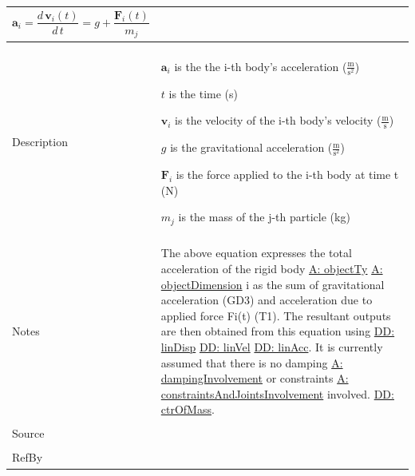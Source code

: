\documentclass[12pt]{article}
\begin{document}
\begin{minipage}{\textwidth}
\begin{tabular}{p{} p{}}
\begin{dmath}
           {\mathbf{a}_{i}}=\frac{d\,{\mathbf{v}_{i}}\left(t\right)}{d\,t}=g+\frac{{\mathbf{F}_{i}}\left(t\right)}{{m_{j}}}
           \end{dmath}
\\ \midrule \\
Description & \begin{symbDescription}
              \item{${\mathbf{a}_{i}}$ is the the i-th body's acceleration ($\frac{\text{m}}{\text{s}^{2}}$)}
              \item{$t$ is the time (s)}
              \item{${\mathbf{v}_{i}}$ is the velocity of the i-th body's velocity ($\frac{\text{m}}{\text{s}}$)}
              \item{$g$ is the gravitational acceleration ($\frac{\text{m}}{\text{s}^{2}}$)}
              \item{${\mathbf{F}_{i}}$ is the force applied to the i-th body at time t (N)}
              \item{${m_{j}}$ is the mass of the j-th particle (kg)}
              \end{symbDescription}
\\ \midrule \\
Notes & The above equation expresses the total acceleration of the rigid body \hyperref[A:objectTy]{A: objectTy} \hyperref[A:objectDimension]{A: objectDimension} i as the sum of gravitational acceleration (GD3) and acceleration due to applied force Fi(t) (T1). The resultant outputs are then obtained from this equation using \hyperref[DD:linDisp]{DD: linDisp} \hyperref[DD:linVel]{DD: linVel} \hyperref[DD:linAcc]{DD: linAcc}.  It is currently assumed that there is no damping \hyperref[A:dampingInvolvement]{A: dampingInvolvement} or constraints \hyperref[A:constraintsAndJointsInvolvement]{A: constraintsAndJointsInvolvement} involved. \hyperref[DD:ctrOfMass]{DD: ctrOfMass}.
\\ \midrule \\
Source & 
\\ \midrule \\
RefBy & 
\\ \bottomrule \end{tabular}
\end{minipage}\\
~\newline
\end{document}
